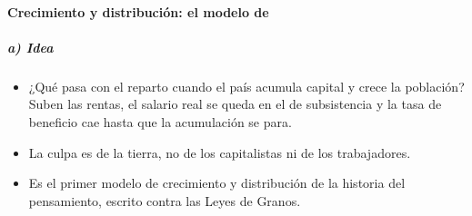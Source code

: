 \documentclass[11pt]{article}
\begin{document}
\paragraph{Crecimiento y distribución: el modelo de }\label{sec:ricardo-distribucion}

\subparagraph{a) Idea}
\begin{itemize}
\item ¿Qué pasa con el reparto cuando el país acumula capital y crece la población? Suben las rentas, el salario real se queda en el de subsistencia y la tasa de beneficio cae hasta que la acumulación se para.
\item La culpa es de la tierra, no de los capitalistas ni de los trabajadores.
\item Es el primer modelo de crecimiento y distribución de la historia del pensamiento, escrito contra las Leyes de Granos\nocite{Ricardo1815Essay}.
\end{itemize}
\end{document}
